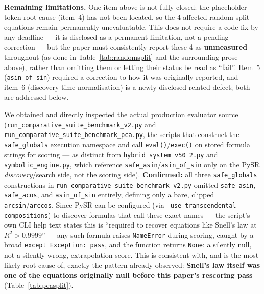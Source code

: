 \documentclass[twoside,11pt]{article}
\newcommand{\Rsq}{R^{2}}
\begin{document}
\textbf{Remaining limitations.} One item above is not fully closed: the
placeholder-token root cause (item~4) has not been located, so the 4
affected random-split equations remain permanently unevaluatable. This
does not require a code fix by any deadline --- it is disclosed as a
permanent limitation, not a pending correction --- but the paper must
consistently report these 4 as \textbf{unmeasured} throughout (as done in
Table~\ref{tab:randomsplit} and the surrounding prose above), rather than
omitting them or letting their status be read as ``fail''. Item~5
(\texttt{asin\_of\_sin}) required a correction to how it
was originally reported, and item~6 (discovery-time normalisation) is a
newly-disclosed related defect; both are addressed below.

We obtained and directly inspected the actual production evaluator source
(\texttt{run\_comparative\_suite\_benchmark\_v2.py} and
\texttt{run\_comparative\_suite\_benchmark\_pca.py}, the scripts that
construct the \texttt{safe\_globals} execution namespace and call
\texttt{eval()}/\texttt{exec()} on stored formula strings for scoring ---
as distinct from \texttt{hybrid\_system\_v50\_2.py} and
\texttt{symbolic\_engine.py}, which reference
\texttt{safe\_asin}/\texttt{asin\_of\_sin} only on the PySR
\emph{discovery}/search side, not the scoring side). \textbf{Confirmed:}
all three \texttt{safe\_globals} constructions in
\texttt{run\_comparative\_suite\_benchmark\_v2.py} omitted
\texttt{safe\_asin}, \texttt{safe\_acos}, and \texttt{asin\_of\_sin}
entirely, defining only a bare, clipped \texttt{arcsin}/\texttt{arccos}.
Since PySR can be configured (via \texttt{--use-transcendental-compositions})
to discover formulas that call these exact names --- the script's own CLI
help text states this is ``required to recover equations like Snell's law
at $\Rsq>0.9999$'' --- any such formula raises \texttt{NameError} during
scoring, caught by a broad \texttt{except Exception: pass}, and the
function returns \texttt{None}: a silently null, not a silently wrong,
extrapolation score. This is consistent with, and is the most likely root
cause of, exactly the pattern already observed: \textbf{Snell's law itself
was one of the equations originally null before this paper's rescoring
pass} (Table~\ref{tab:pcasplit}).
\end{document}
